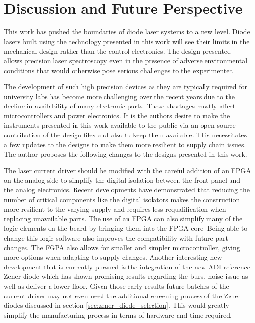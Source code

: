 \chapter{Discussion and Future Perspective}%
\label{sec:outlook}
This work has pushed the boundaries of diode laser systems to a new level. Diode lasers built using the technology presented in this work will see their limits in the mechanical design rather than the control electronics. The design presented allows precision laser spectroscopy even in the presence of adverse environmental conditions that would otherwise pose serious challenges to the experimenter.

The development of such high precision devices as they are typically required for university labs has become more challenging over the recent years due to the decline in availability of many electronic parts. These shortages mostly affect microcontrollers and power electronics. It is the authors desire to make the instruments presented in this work available to the public via an open-source contribution of the design files and also to keep them available. This necessitates a few updates to the designs to make them more resilient to supply chain issues. The author proposes the following changes to the designs presented in this work.

The  laser current driver should be modified with the careful addition of an FPGA on the analog side to simplify the digital isolation between the front panel and the analog electronics. Recent developments have demonstrated that reducing the number of critical components like the digital isolators makes the construction more resilient to the varying supply and requires less requalification when replacing unavailable parts. The use of an FPGA can also simplify many of the logic elements on the board by bringing them into the FPGA core. Being able to change this logic software also improves the compatibility with future part changes. The FGPA also allows for smaller and simpler microcontroller, giving more options when adapting to supply changes. Another interesting new development that is currently pursued is the integration of the new ADI  reference Zener diode which has shown promising results regarding the burst noise issue as well as deliver a lower floor. Given those early results future batches of the current driver may not even need the additional screening process of the Zener diodes discussed in section \ref{sec:zener_diode_selection}. This would greatly simplify the manufacturing process in terms of hardware and time required.

